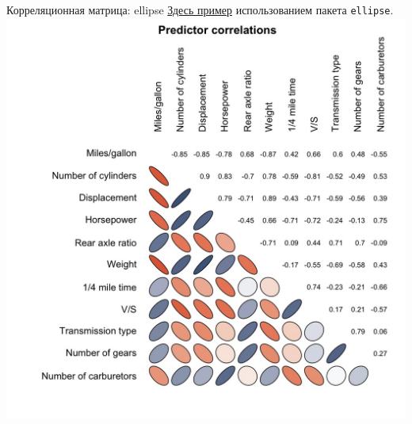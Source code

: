 \begin{frame}{Корреляционная матрица: ellipse}
\href{https://hlplab.wordpress.com/2012/03/20/correlation-plot-matrices-using-the-ellipse-library/}{\alert{Здесь пример}} использованием пакета \scriptsize\verb"ellipse"\normalsize.\\
\includegraphics[width=0.70\linewidth]{plotcor.jpg}
\end{frame}
